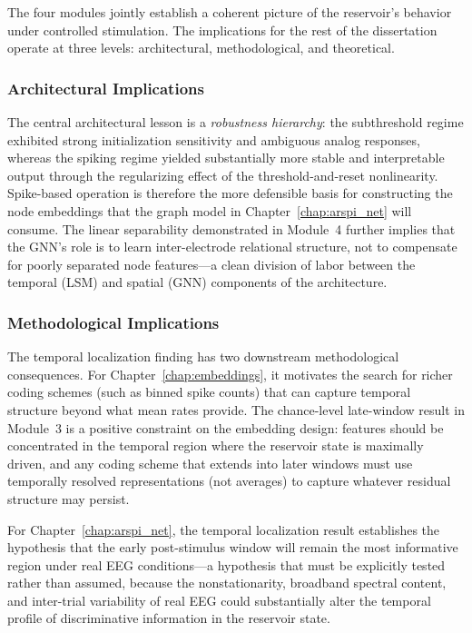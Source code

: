 The four modules jointly establish a coherent picture of the reservoir's behavior under controlled stimulation. The implications for the rest of the dissertation operate at three levels: architectural, methodological, and theoretical.

\subsubsection{Architectural Implications}

The central architectural lesson is a \emph{robustness hierarchy}: the subthreshold regime exhibited strong initialization sensitivity and ambiguous analog responses, whereas the spiking regime yielded substantially more stable and interpretable output through the regularizing effect of the threshold-and-reset nonlinearity. Spike-based operation is therefore the more defensible basis for constructing the node embeddings that the graph model in Chapter~\ref{chap:arspi_net} will consume. The linear separability demonstrated in Module~4 further implies that the GNN's role is to learn inter-electrode relational structure, not to compensate for poorly separated node features---a clean division of labor between the temporal (LSM) and spatial (GNN) components of the architecture.

\subsubsection{Methodological Implications}

The temporal localization finding has two downstream methodological consequences. For Chapter~\ref{chap:embeddings}, it motivates the search for richer coding schemes (such as binned spike counts) that can capture temporal structure beyond what mean rates provide. The chance-level late-window result in Module~3 is a positive constraint on the embedding design: features should be concentrated in the temporal region where the reservoir state is maximally driven, and any coding scheme that extends into later windows must use temporally resolved representations (not averages) to capture whatever residual structure may persist.

For Chapter~\ref{chap:arspi_net}, the temporal localization result establishes the hypothesis that the early post-stimulus window will remain the most informative region under real EEG conditions---a hypothesis that must be explicitly tested rather than assumed, because the nonstationarity, broadband spectral content, and inter-trial variability of real EEG could substantially alter the temporal profile of discriminative information in the reservoir state.

